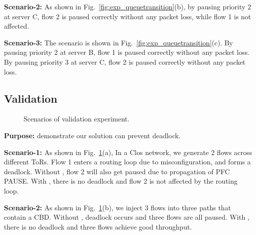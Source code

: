 \textbf{Scenario-2:} As shown in Fig.~\ref{fig:exp_queuetransition}(b), by pausing priority 2 at server C, flow 2 is paused correctly without any packet loss, while flow 1 is not affected.

\textbf{Scenario-3:} The scenario is shown in Fig.~\ref{fig:exp_queuetransition}(c). By pausing priority 2 at server B, flow 1 is paused correctly without any packet loss. By pausing priority 3 at server C, flow 2 is paused correctly without any packet loss.

\subsection{Validation}\label{subsec:exp_validation}

\begin{figure}[t]
	\centering
	
	
	\caption{Scenarios of validation experiment.}\label{fig:exp_validation}
	
\end{figure}

\textbf{Purpose:} demonstrate our solution can prevent deadlock.

\textbf{Scenario-1:} As shown in Fig.~\ref{fig:exp_validation}(a), In a Clos network, we generate 2 flows across different ToRs. Flow 1 enters a routing loop due to misconfiguration, and forms a deadlock. Without \sysname{}, flow 2 will also get paused due to propagation of PFC PAUSE. With \sysname{}, there is no deadlock and flow 2 is not affected by the routing loop.

\textbf{Scenario-2:} As shown in Fig.~\ref{fig:exp_validation}(b), we inject 3 flows into three paths that contain a CBD. Without \sysname{}, deadlock occurs and three flows are all paused. With \sysname{}, there is no deadlock and three flows achieve good throughput.

